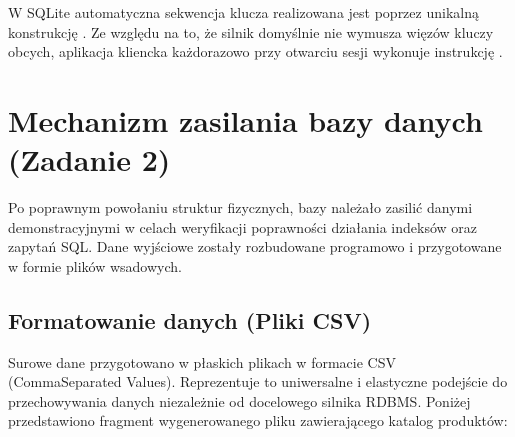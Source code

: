 \documentclass[letterpaper,10pt,polish]{sphinxmanual}
\begin{document}
\begin{sphinxVerbatim}[commandchars=\\\{\}]
\end{sphinxVerbatim}

\sphinxAtStartPar
{} W SQLite automatyczna sekwencja klucza realizowana jest poprzez unikalną konstrukcję . Ze względu na to, że silnik domyślnie nie wymusza więzów kluczy obcych, aplikacja kliencka każdorazowo przy otwarciu sesji wykonuje instrukcję .


\section{Mechanizm zasilania bazy danych (Zadanie 2)}
\label{\detokenize{rozdzia_u0142_4/BD_WprowadzanieBD/index:mechanizm-zasilania-bazy-danych-zadanie-2}}
\sphinxAtStartPar
Po poprawnym powołaniu struktur fizycznych, bazy należało zasilić danymi demonstracyjnymi w celach weryfikacji poprawności działania indeksów oraz zapytań SQL. Dane wyjściowe zostały rozbudowane programowo i przygotowane w formie plików wsadowych.


\subsection{Formatowanie danych (Pliki CSV)}
\label{\detokenize{rozdzia_u0142_4/BD_WprowadzanieBD/index:formatowanie-danych-pliki-csv}}
\sphinxAtStartPar
Surowe dane przygotowano w płaskich plikach w formacie CSV (Comma\sphinxhyphen{}Separated Values). Reprezentuje to uniwersalne i elastyczne podejście do przechowywania danych niezależnie od docelowego silnika RDBMS. Poniżej przedstawiono fragment wygenerowanego pliku zawierającego katalog produktów:
\end{document}
